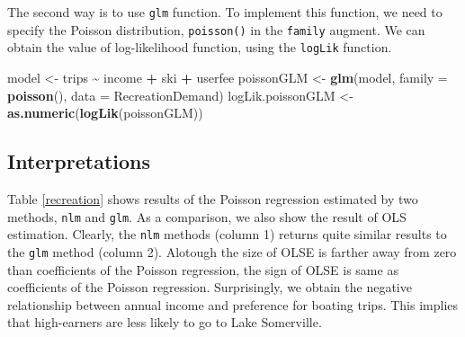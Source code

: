\documentclass[
  12pt,
]{article}
\newenvironment{Shaded}{\begin{snugshade}}{\end{snugshade}}
\newcommand{\DataTypeTok}[1]{\textcolor[rgb]{0.13,0.29,0.53}{#1}}
\newcommand{\KeywordTok}[1]{\textcolor[rgb]{0.13,0.29,0.53}{\textbf{#1}}}
\newcommand{\NormalTok}[1]{#1}
\newcommand{\OperatorTok}[1]{\textcolor[rgb]{0.81,0.36,0.00}{\textbf{#1}}}
\newcommand{\StringTok}[1]{\textcolor[rgb]{0.31,0.60,0.02}{#1}}
\begin{document}
The second way is to use \texttt{glm} function. To implement this
function, we need to specify the Poisson distribution,
\texttt{poisson()} in the \texttt{family} augment. We can obtain the
value of log-likelihood function, using the \texttt{logLik} function.

\begin{Shaded}
\begin{Highlighting}[]
\NormalTok{model \textless{}{-}}\StringTok{ }\NormalTok{trips }\OperatorTok{\textasciitilde{}}\StringTok{ }\NormalTok{income }\OperatorTok{+}\StringTok{ }\NormalTok{ski }\OperatorTok{+}\StringTok{ }\NormalTok{userfee}
\NormalTok{poissonGLM \textless{}{-}}\StringTok{ }\KeywordTok{glm}\NormalTok{(model, }\DataTypeTok{family =} \KeywordTok{poisson}\NormalTok{(), }\DataTypeTok{data =}\NormalTok{ RecreationDemand)}
\NormalTok{logLik.poissonGLM \textless{}{-}}\StringTok{ }\KeywordTok{as.numeric}\NormalTok{(}\KeywordTok{logLik}\NormalTok{(poissonGLM))}
\end{Highlighting}
\end{Shaded}

\hypertarget{interpretations-2}{%
\subsection{Interpretations}\label{interpretations-2}}

Table \ref{recreation} shows results of the Poisson regression estimated
by two methods, \texttt{nlm} and \texttt{glm}. As a comparison, we also
show the result of OLS estimation. Clearly, the \texttt{nlm} methods
(column 1) returns quite similar results to the \texttt{glm} method
(column 2). Alotough the size of OLSE is farther away from zero than
coefficients of the Poisson regression, the sign of OLSE is same as
coefficients of the Poisson regression. Surprisingly, we obtain the
negative relationship between annual income and preference for boating
trips. This implies that high-earners are less likely to go to Lake
Somerville.
\end{document}
